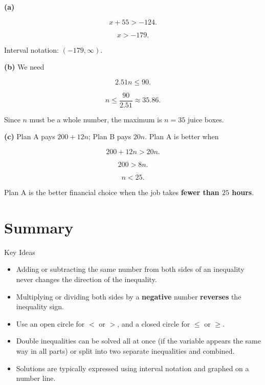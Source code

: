\documentclass[12pt]{article}
\begin{document}
 

\begin{solutionbox}
\textbf{(a)}

\[
x+55>-124.
\]

\[
x>-179.
\]

Interval notation: $(-179,\infty)$.

\textbf{(b)} We need

\[
2.51n\le 90.
\]

\[
n\le \frac{90}{2.51}\approx 35.86.
\]

Since $n$ must be a whole number, the maximum is $n=35$ juice boxes.

\textbf{(c)} Plan A pays $200+12n$; Plan B pays $20n$. Plan A is better when

\[
200+12n>20n.
\]

\[
200>8n.
\]

\[
n<25.
\]

Plan A is the better financial choice when the job takes \textbf{fewer than $25$ hours}.
\end{solutionbox}

  

\section*{Summary}

\begin{friendlyrule}{Key Ideas}
\begin{itemize}
    \item Adding or subtracting the same number from both sides of an inequality never changes the direction of the inequality.
    \item Multiplying or dividing both sides by a \textbf{negative} number \textbf{reverses} the inequality sign.
    \item Use an open circle for $<$ or $>$, and a closed circle for $\le$ or $\ge$.
    \item Double inequalities can be solved all at once (if the variable appears the same way in all parts) or split into two separate inequalities and combined.
    \item Solutions are typically expressed using interval notation and graphed on a number line.
\end{itemize}
\end{friendlyrule}
\end{document}
